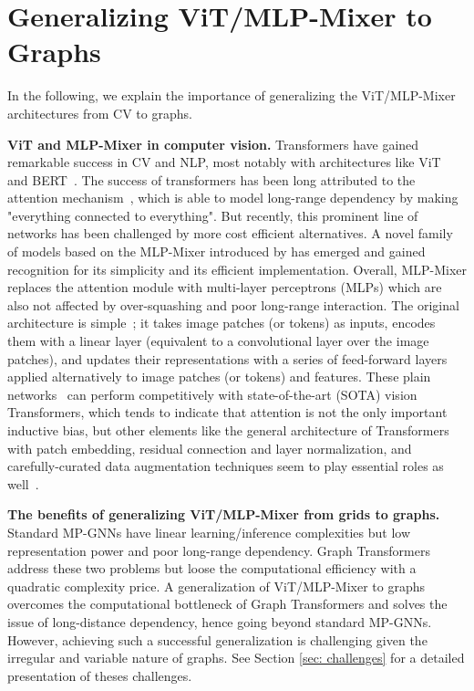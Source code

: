 \documentclass{article}
\begin{document}
\section{Generalizing ViT/MLP-Mixer to Graphs}\label{sec:contribution}
In the following, we explain the importance of generalizing the ViT/MLP-Mixer architectures from CV to graphs. 

\textbf{ViT and MLP-Mixer in computer vision.} Transformers have gained remarkable success in CV and NLP, most notably with architectures like ViT~\citep{dosovitskiy2020ViT} and BERT~\citep{devlin2018bert}. The success of transformers has been long attributed to the attention mechanism~\citep{vaswani2017attention}, which is able to model long-range dependency by making "everything connected to everything".
But recently, this prominent line of networks has been challenged by more cost efficient alternatives. %
A novel family of models based on the MLP-Mixer introduced by \citet{tolstikhin2021mlp} has emerged and gained recognition for its simplicity and its efficient implementation. Overall, MLP-Mixer replaces the attention module with multi-layer perceptrons (MLPs) which are also not affected by over-squashing and poor long-range interaction. The original architecture is simple~\citep{tolstikhin2021mlp}; it takes image patches (or tokens) as inputs, encodes them with a linear layer (equivalent to a convolutional layer over the image patches), and updates their representations with a series of feed-forward layers applied alternatively to image patches (or tokens) and features. 
These plain networks~\citep{tolstikhin2021mlp, touvron2021resmlp, liu2021gmlp, wang2022dynamixer} can perform competitively with state-of-the-art (SOTA) vision Transformers, which tends to indicate that attention is not the only important inductive bias, but other elements like the general architecture of Transformers with patch embedding, residual connection and layer normalization, and carefully-curated data augmentation techniques seem to play essential roles as well~\citep{yu2022metaformer}.


\textbf{The benefits of generalizing ViT/MLP-Mixer from grids to graphs.} 
Standard MP-GNNs have linear learning/inference complexities but low representation power and poor long-range dependency. Graph Transformers address these two problems but loose the computational efficiency with a quadratic complexity price. A generalization of ViT/MLP-Mixer to graphs overcomes the computational bottleneck of Graph Transformers and solves the issue of long-distance dependency, hence going beyond standard MP-GNNs.  However, achieving such a successful generalization is challenging given the irregular and variable nature of graphs. See Section \ref{sec: challenges} for a detailed presentation of theses challenges.
\end{document}
